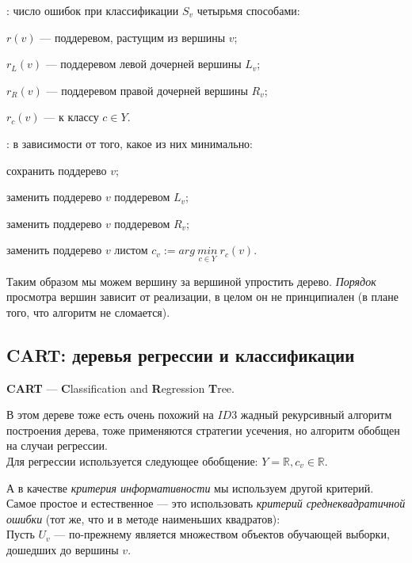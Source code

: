 \documentclass{article}
\begin{document}
\begin{itemize}
\qquad {}: \qquad число ошибок при классификации $S_v$ четырьмя способами:
		
			\qquad \qquad \qquad \qquad $r(v)$ --- поддеревом, растущим из вершины $v$;
			
			\qquad \qquad \qquad \qquad $r_L(v)$ --- поддеревом левой дочерней вершины $L_v$;
			
			\qquad \qquad \qquad \qquad $r_R(v)$ --- поддеревом правой дочерней вершины $R_v$;

			\qquad \qquad \qquad \qquad $r_c(v)$ --- к классу $c \in Y$.


\qquad {}: \qquad в зависимости от того, какое из них минимально:
		
			\qquad \qquad \qquad \qquad сохранить поддерево $v$;
			
			\qquad \qquad \qquad \qquad заменить поддерево $v$ поддеревом $L_v$;
			
			\qquad \qquad \qquad \qquad заменить поддерево $v$ поддеревом $R_v$;

			\qquad \qquad \qquad \qquad заменить поддерево $v$ листом
							$c_v := arg\ \underset{c \in Y}{min}\ r_c(v)$.
\end{itemize}

Таким образом мы можем вершину за вершиной упростить дерево. \textit{Порядок} просмотра вершин зависит от реализации, в целом он не принципиален (в плане того, что алгоритм не сломается).

\subsection{CART: деревья регрессии и классификации}

\textbf{CART} --- \textbf{C}lassification and \textbf{R}egression \textbf{T}ree.

В этом дереве тоже есть очень похожий на $ID3$ жадный рекурсивный алгоритм построения дерева, тоже применяются стратегии усечения, но алгоритм обобщен на случаи регрессии.
\\

Для регрессии используется следующее обобщение: $Y = \mathbb{R}, c_v \in \mathbb{R}$.

А в качестве \textit{критерия информативности} мы используем другой критерий. Самое простое и естественное --- это использовать \textit{критерий среднеквадратичной ошибки} (тот же, что и в методе наименьших квадратов):
\\

Пусть $U_v$ --- по-прежнему является множеством объектов обучающей выборки, дошедших до вершины $v$.
\end{document}
